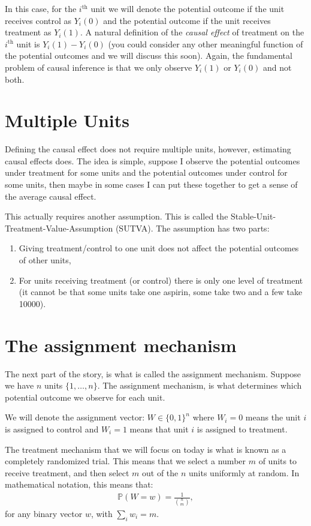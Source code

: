\documentclass[twoside,12pt]{article}
\begin{document}
In this case, for the $i^{\text{th}}$ unit we will denote the potential outcome if the unit receives control as $Y_i(0)$ and the potential outcome if the unit receives treatment as $Y_i(1)$. 
A natural definition of the \emph{causal effect} of treatment on the $i^{\text{th}}$ unit is $Y_i(1) - Y_i(0)$ (you could consider any other meaningful function of the potential outcomes and we will discuss this soon).
Again, the fundamental problem of causal inference is that we only observe $Y_i(1)$ or $Y_i(0)$ and not both. 

\section{Multiple Units}
Defining the causal effect does not require multiple units, however, estimating causal effects does. The idea is simple, suppose I observe the potential outcomes under treatment for some units and the potential outcomes under control for some units, then maybe in some cases I can put these together to get a sense of the average causal effect. 

This actually requires another assumption. This is called the Stable-Unit-Treatment-Value-Assumption (SUTVA). The assumption has two parts:
\begin{enumerate}
\item Giving treatment/control to one unit does not affect the potential outcomes of other units, 
\item For units receiving treatment (or control) there is only one level of treatment (it cannot be that some units take one aspirin, some take two and a few take 10000). 
\end{enumerate}

\section{The assignment mechanism}
The next part of the story, is what is called the assignment mechanism. 
Suppose we have $n$ units $\{1,\ldots,n\}$.
The assignment mechanism, is what determines which potential outcome we observe for each unit.

We will denote the assignment vector: $W \in \{0,1\}^n$ where $W_i = 0$ means the unit $i$ is assigned
to control and $W_i = 1$ means that unit $i$ is assigned to treatment.

The treatment mechanism that we will focus on today is what is known as a completely 
randomized trial. This means that we select a number $m$ of units to receive treatment, and then select $m$ out of the $n$ units uniformly at random. 
In mathematical notation, this means that:
\begin{align*}
\mathbb{P}(W = w) = \frac{1}{{n \choose m}},
\end{align*}
for any binary vector $w$, with $\sum_i w_i = m$. 
\end{document}
